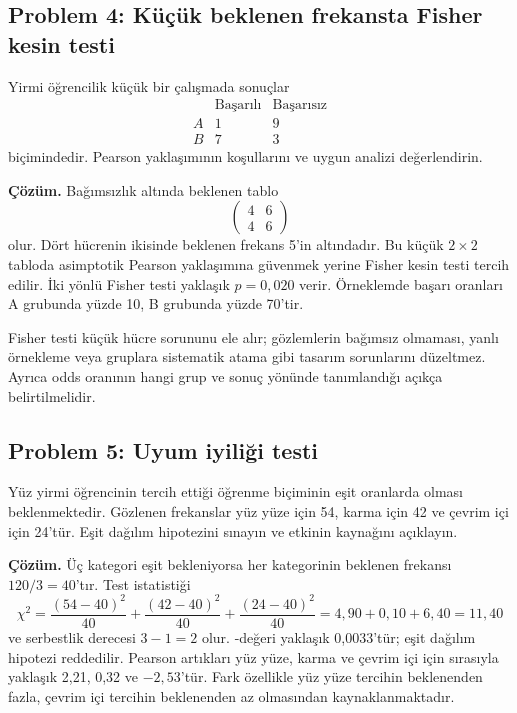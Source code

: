 \subsection*{Problem 4: Küçük beklenen frekansta Fisher kesin testi}

Yirmi öğrencilik küçük bir çalışmada sonuçlar
\[
\begin{array}{c|rr}
 & \text{Başarılı} & \text{Başarısız}\\ \hline
A&1&9\\
B&7&3
\end{array}
\]
biçimindedir. Pearson yaklaşımının koşullarını ve uygun analizi değerlendirin.

\textbf{Çözüm.} Bağımsızlık altında beklenen tablo
\[
\begin{pmatrix}4&6\\4&6\end{pmatrix}
\]
olur. Dört hücrenin ikisinde beklenen frekans 5'in altındadır. Bu küçük
$2\times2$ tabloda asimptotik Pearson yaklaşımına güvenmek yerine Fisher kesin
testi tercih edilir. İki yönlü Fisher testi yaklaşık $p=0{,}020$ verir.
Örneklemde başarı oranları A grubunda yüzde 10, B grubunda yüzde 70'tir.

Fisher testi küçük hücre sorununu ele alır; gözlemlerin bağımsız olmaması,
yanlı örnekleme veya gruplara sistematik atama gibi tasarım sorunlarını
düzeltmez. Ayrıca odds oranının hangi grup ve sonuç yönünde tanımlandığı açıkça
belirtilmelidir.

\subsection*{Problem 5: Uyum iyiliği testi}

Yüz yirmi öğrencinin tercih ettiği öğrenme biçiminin eşit oranlarda olması
beklenmektedir. Gözlenen frekanslar yüz yüze için 54, karma için 42 ve çevrim
içi için 24'tür. Eşit dağılım hipotezini sınayın ve etkinin kaynağını açıklayın.

\textbf{Çözüm.} Üç kategori eşit bekleniyorsa her kategorinin beklenen
frekansı $120/3=40$'tır. Test istatistiği
\[
\chi^2=\frac{(54-40)^2}{40}+\frac{(42-40)^2}{40}
+\frac{(24-40)^2}{40}=4{,}90+0{,}10+6{,}40=11{,}40
\]
ve serbestlik derecesi $3-1=2$ olur. \pval-değeri yaklaşık 0,0033'tür; eşit
dağılım hipotezi reddedilir. Pearson artıkları yüz yüze, karma ve çevrim içi
için sırasıyla yaklaşık 2,21, 0,32 ve $-2{,}53$'tür. Fark özellikle yüz yüze
tercihin beklenenden fazla, çevrim içi tercihin beklenenden az olmasından
kaynaklanmaktadır.

